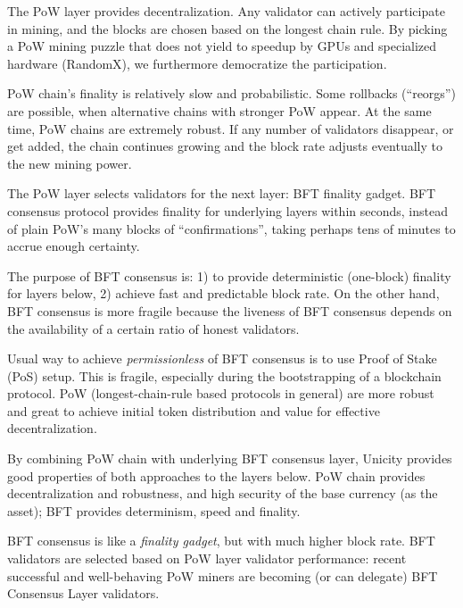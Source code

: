 \documentclass{llncs}
\begin{document}
The PoW layer provides decentralization. Any validator can actively participate in mining, and the blocks are chosen based on the longest chain rule. By picking a PoW mining puzzle that does not yield to speedup by GPUs and specialized hardware (RandomX), we furthermore democratize the participation.

PoW chain's finality is relatively slow and probabilistic. Some rollbacks (``reorgs'') are possible, when alternative chains with stronger PoW appear. At the same time, PoW chains are extremely robust. If any number of validators disappear, or get added, the chain continues growing and the block rate adjusts eventually to the new mining power.

The PoW layer selects validators for the next layer: BFT finality gadget. BFT consensus protocol provides finality for underlying layers within seconds, instead of plain PoW's many blocks of ``confirmations'', taking perhaps tens of minutes to accrue enough certainty.

The purpose of BFT consensus is: 1) to provide deterministic (one-block) finality for layers below, 2) achieve fast and predictable block rate. On the other hand, BFT consensus is more fragile because the liveness of BFT consensus depends on the availability of a certain ratio of honest validators.

Usual way to achieve \emph{permissionless} of BFT consensus is to use Proof of Stake (PoS) setup. This is fragile, especially during the bootstrapping of a blockchain protocol. PoW (longest-chain-rule based protocols in general) are more robust and great to achieve initial token distribution and value for effective decentralization.

By combining PoW chain with underlying BFT consensus layer, Unicity provides good properties of both approaches to the layers below. PoW chain provides decentralization and robustness, and high security of the base currency (as the asset); BFT provides determinism, speed and finality.

BFT consensus is like a \emph{finality gadget}, but with much higher block rate. BFT validators are selected based on PoW layer validator performance: recent successful and well-behaving PoW miners are becoming (or can delegate) BFT Consensus Layer validators.


\end{document}
